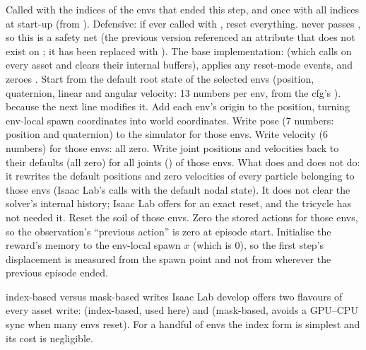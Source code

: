 \begin{explain}
 Called with the indices of the envs that ended this step, and once
  with all indices at start-up (from ).
 Defensive: if ever called with , reset everything.
   never passes , so this is a safety net (the
  previous version referenced an attribute that does not exist on
  ; it has been replaced with ).
 The base implementation:  (which calls
   on every asset and clears their internal buffers), applies
  any reset-mode events, and zeroes .
 Start from the default root state of the selected envs (position,
  quaternion, linear and angular velocity: 13 numbers per env, from the
  cfg's ).  because the next line modifies
  it.
 Add each env's origin to the position, turning env-local spawn
  coordinates into world coordinates.
 Write pose (7 numbers: position and quaternion) to the simulator
  for those envs.
 Write velocity (6 numbers) for those envs: all zero.
 Write joint positions and velocities back to their defaults
  (all zero) for all joints () of those envs.
 What  does and does not do: it rewrites the
  default positions and zero velocities of every particle belonging to those
  envs (Isaac Lab's  calls
   with the default nodal state). It
  does not clear the solver's internal history; Isaac Lab offers
   for an exact reset, and the
  tricycle has not needed it.
 Reset the soil of those envs.
 Zero the stored actions for those envs, so the observation's
  ``previous action'' is zero at episode start.
 Initialise the reward's memory to the env-local spawn $x$ (which is
  0), so the first step's displacement is measured from the spawn point and
  not from wherever the previous episode ended.
\end{explain}

\begin{isaacbox}{index-based versus mask-based writes}
Isaac Lab develop offers two flavours of every asset write:
 (index-based, used here) and
 (mask-based, avoids a
GPU--CPU sync when many envs reset). For a handful of envs the index form is
simplest and its cost is negligible.
\end{isaacbox}
